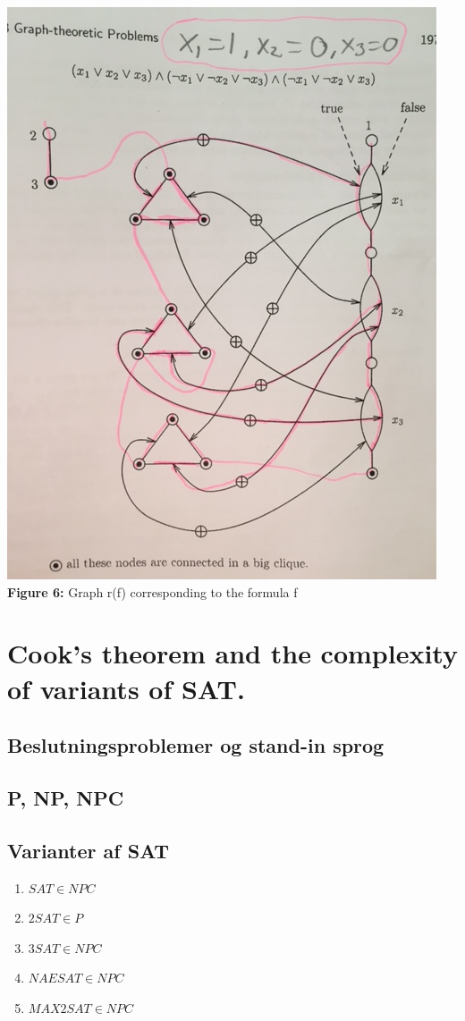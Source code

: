 \documentclass{article}
\begin{document}
\begin{center}
\includegraphics[scale=0.5, angle =-90]{3SATtoHAM}\\
\textbf{Figure 6:} Graph r(f) corresponding to the formula f
\end{center}

\newpage

\section{Cook's theorem and the complexity of variants of SAT.}

\subsection{Beslutningsproblemer og stand-in sprog}
\subsection{P, NP, NPC}
\subsection{Varianter af SAT}
\begin{enumerate}
    \item $SAT \in NPC$
    \item $2SAT \in P$
    \item $3SAT \in NPC$
    \item $NAESAT \in NPC$
    \item $MAX2SAT \in NPC$
\end{enumerate}
\end{document}
